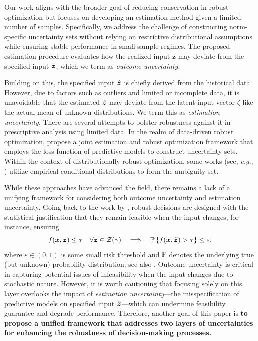 \documentclass[mnsc, nonblindrev]{informswp}
\newcommand{\1}[1]{\mathds{1}{\left(#1\right)}}
\begin{document}
Our work aligns with the broader goal of reducing conservation in robust optimization but focuses on developing an estimation method given a limited number of samples. Specifically, we address the challenge of constructing norm-specific uncertainty sets without relying on restrictive distributional assumptions while ensuring stable performance in small-sample regimes.
The proposed estimation procedure evaluates how the realized input $\bm z$ may deviate from the specified input $\hat{\bm{z}}$, which we term as \emph{outcome uncertainty}.

Building on this, the specified input $\hat{\bm{z}}$ is chiefly derived from the historical data. However, due to factors such as outliers and limited or incomplete data, it is unavoidable that the estimated $\hat{\bm{z}}$ may deviate from the latent input vector $\zeta$ like the actual mean of unknown distributions. We term this as \emph{estimation uncertainty}. There are several attempts to bolster robustness against it in prescriptive analysis using limited data. In the realm of data-driven robust optimization, \cite{Zhu_Xie_Sim_2021joint} propose a joint estimation and robust optimization framework that employs the loss function of predictive models to construct uncertainty sets. Within the context of distributionally robust optimization, some works (see, \textit{e.g.}, \citealt{bertsimas2022bootstrap, Esteban_Morales_2021distributionally,Bertsimas_McCord_Sturt_2022dynamic}) utilize empirical conditional distributions to form the ambiguity set.

While these approaches have advanced the field, there remains a lack of a unifying framework for considering both outcome uncertainty and estimation uncertainty. Going back to the work by \cite{bertsimas2004price}, robust decisions are designed with the statistical justification that they remain feasible when the input changes, for instance, ensuring 
\[
f(\bm x, \bm z) \leq \tau \quad \forall \bm z \in \mathcal{Z}(\gamma) ~~~\Longrightarrow~~~
\mathbb{P}\left\{f(\bm x, \tilde{\bm{z}}) > \tau\right\} \leq \varepsilon,
\]
where $\varepsilon \in (0,1)$ is some small risk threshold and $\mathbb{P}$ denotes the underlying true (but unknown) probability distribution; see also \cite{bertsimas2021probabilistic}. Outcome uncertainty is critical in capturing potential issues of infeasibility when the input changes due to stochastic nature. However, it is worth cautioning that focusing solely on this layer overlooks the impact of \emph{estimation uncertainty}---the misspecification of predictive models on specified input $\hat{\bm{z}}$---which can undermine feasibility guarantee and degrade performance. Therefore, another goal of this paper is {\bf to propose a unified framework that addresses two layers of uncertainties for enhancing the robustness of decision-making processes.}
\end{document}
